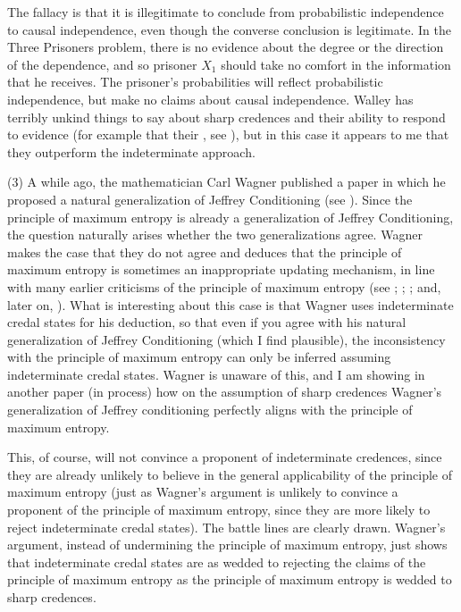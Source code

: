 The fallacy is that it is illegitimate to conclude from
probabilistic independence to causal independence, even
though the converse conclusion is legitimate. In the
Three Prisoners problem, there is no evidence about the
degree or the direction of the dependence, and so
prisoner $X_{1}$ should take no comfort in the
information that he receives. The prisoner's
probabilities will reflect probabilistic independence,
but make no claims about causal independence. Walley
has terribly unkind things to say about sharp credences
and their ability to respond to evidence (for example
that their , see ), but in this
case it appears to me that they outperform the
indeterminate approach.

(3) A while ago, the mathematician Carl Wagner
published a paper in which he proposed a natural
generalization of Jeffrey Conditioning (see
). Since the principle of maximum
entropy is already a generalization of Jeffrey
Conditioning, the question naturally arises whether the
two generalizations agree. Wagner makes the case that
they do not agree and deduces that the principle of
maximum entropy is sometimes an inappropriate updating
mechanism, in line with many earlier criticisms of the
principle of maximum entropy (see
; ;
; and, later on,
). What is interesting about
this case is that Wagner uses indeterminate credal
states for his deduction, so that even if you agree
with his natural generalization of Jeffrey Conditioning
(which I find plausible), the inconsistency with the
principle of maximum entropy can only be inferred
assuming indeterminate credal states. Wagner is unaware
of this, and I am showing in another paper (in process)
how on the assumption of sharp credences Wagner's
generalization of Jeffrey conditioning perfectly aligns
with the principle of maximum entropy.

This, of course, will not convince a proponent of
indeterminate credences, since they are already
unlikely to believe in the general applicability of the
principle of maximum entropy (just as Wagner's argument
is unlikely to convince a proponent of the principle of
maximum entropy, since they are more likely to reject
indeterminate credal states). The battle lines are
clearly drawn. Wagner's argument, instead of
undermining the principle of maximum entropy, just
shows that indeterminate credal states are as wedded to
rejecting the claims of the principle of maximum
entropy as the principle of maximum entropy is wedded
to sharp credences.

